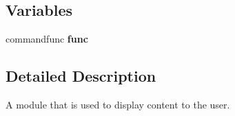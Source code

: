 \subsection*{Variables}
\begin{DoxyCompactItemize}
\item 
\hypertarget{namespaceCMD__VIEW_a4d91c7e54ce836eb76f3bd7f585db4dd}{commandfunc {\bfseries func}}\label{namespaceCMD__VIEW_a4d91c7e54ce836eb76f3bd7f585db4dd}

\end{DoxyCompactItemize}


\subsection{Detailed Description}
A module that is used to display content to the user. 